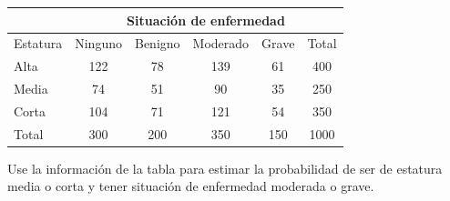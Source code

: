 \documentclass[letterpaper,fleqn]{article}
\begin{document}
\begin{enumerate}
\begin{center}
\begin{tabular}{lccccc}
 & \multicolumn{5}{c}{Situación de enfermedad} \\ \hline 
Estatura & Ninguno & Benigno & Moderado & Grave & Total \\ \hline
Alta & 122 & 78 & 139 & 61 & 400 \\ 
Media & 74 & 51 & 90 & 35 & 250 \\ 
Corta & 104 & 71 & 121 & 54 & 350 \\ 
\hline 
Total & 300 & 200 & 350 & 150 & 1000 \\ 
\hline 
\end{tabular} 
\end{center}
Use la información de la tabla para estimar la probabilidad de ser de estatura media o corta y tener situación de enfermedad moderada o grave.\noanswer
 \end{enumerate}
\end{document}
